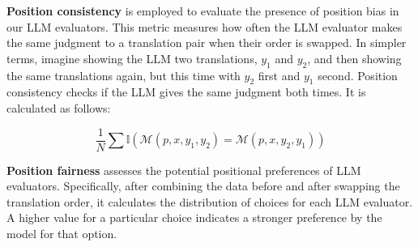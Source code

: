 \documentclass{article}
\theoremstyle{plain}
\theoremstyle{definition}
\theoremstyle{remark}
\begin{document}
\textbf{Position consistency} is employed to evaluate the presence of position bias in our LLM evaluators. This metric measures how often the LLM evaluator makes the same judgment to a translation pair when their order is swapped. In simpler terms, imagine showing the LLM two translations, $y_1$ and $y_2$, and then showing the same translations again, but this time with $y_2$ first and $y_1$ second. Position consistency checks if the LLM gives the same judgment both times. It is calculated as follows:

\begin{equation}
    \frac{1}{N} \sum \mathbb{I}(\mathcal{M}(p,x,y_1,y_2) = \mathcal{M}(p,x,y_2,y_1))
    \label{placeholder_label}
\end{equation}

\textbf{Position fairness} assesses the potential positional preferences of LLM evaluators. Specifically, after combining the data before and after swapping the translation order, it calculates the distribution of choices for each LLM evaluator. A higher value for a particular choice indicates a stronger preference by the model for that option.
\end{document}
